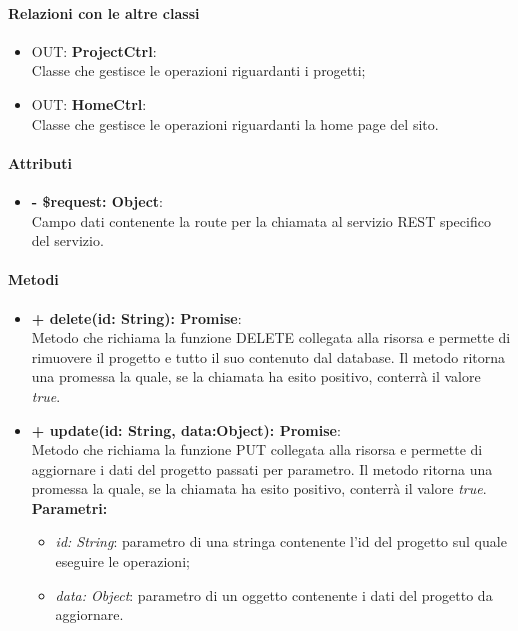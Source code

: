 		\paragraph{Relazioni con le altre classi}
		\begin{itemize}
			\item OUT: \textbf{ProjectCtrl}:\\
				Classe che gestisce le operazioni riguardanti i progetti;
			\item OUT: \textbf{HomeCtrl}:\\
				Classe che gestisce le operazioni riguardanti la home page del sito.
		\end{itemize}
		
		\paragraph{Attributi}
		\begin{itemize}
			\item \textbf{- \$request: Object}:\\
			Campo dati contenente la route per la chiamata al servizio \gls{REST} specifico del servizio.
		\end{itemize}	
		
		\paragraph{Metodi}
		\begin{itemize}
			\item \textbf{+ delete(id: String): Promise}:\\
			Metodo che richiama la funzione DELETE collegata alla risorsa e permette di rimuovere il progetto e tutto il suo contenuto dal \gls{database}. Il metodo ritorna una promessa la quale, se la chiamata ha esito positivo, conterrà il valore \textit{true}.\\
			\item \textbf{+ update(id: String, data:Object): Promise}:\\
			Metodo che richiama la funzione PUT collegata alla risorsa e permette di aggiornare i dati del progetto passati per parametro. Il metodo ritorna una promessa la quale, se la chiamata ha esito positivo, conterrà il valore \textit{true}.\\
			\textbf{Parametri:}\\
			\begin{itemize}
				\item \textit{id: String}: parametro di una stringa contenente l'id del progetto sul quale eseguire le operazioni;
				\item \textit{data: Object}: parametro di un oggetto contenente i dati del progetto da aggiornare.
			\end{itemize}
		\end{itemize}
\newpage


